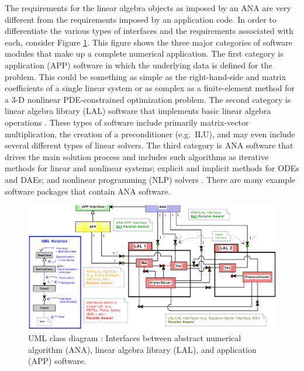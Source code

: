 The requirements for the linear algebra objects as imposed by an ANA
are very different from the requirements imposed by an application
code.  In order to differentiate the various types of interfaces and
the requirements associated with each, consider Figure
{}\ref{tsfcore:fig:ANA_LAL_APP}.  This figure shows the three major
categories of software modules that make up a complete numerical
application.  The first category is application (APP) software in
which the underlying data is defined for the problem.  This could be
something as simple as the right-hand-side and matrix coefficients of
a single linear system or as complex as a finite-element method for a
3-D nonlinear PDE-constrained optimization problem.  The second
category is linear algebra library (LAL) software that implements
basic linear algebra operations {}\cite{ref:demmel_1997,
ref:anderson_1995, ref:blackford_et_al_1997, ref:aztec, ref:petsc,
ref:trilinos}. These types of software include primarily matrix-vector
multiplication, the creation of a preconditioner (e.g.~ILU), and may
even include several different types of linear solvers.  The third
category is ANA software that drives the main solution process and
includes such algorithms as iterative methods for linear and nonlinear
systems; explicit and implicit methods for ODEs and DAEs; and
nonlinear programming (NLP) solvers {}\cite{ref:nocedal_wright_1999}.
There are many example software packages
{}\cite{ref:petsc,ref:aztec,ref:trilinos,ref:pvode,ref:tao} that
contain ANA software.

{\bsinglespace
\begin{figure}[t]
\begin{center}
\includegraphics*[bb= 0.245in 2.95in 10.85in 8.60in,angle=0,scale=0.50
]{analal}
\end{center}
\caption{
\label{tsfcore:fig:ANA_LAL_APP}
UML {}\cite{ref:booch_et_al_1999} class diagram : Interfaces between abstract numerical algorithm
(ANA), linear algebra library (LAL), and application (APP) software.
}
\end{figure}
\esinglespace}

